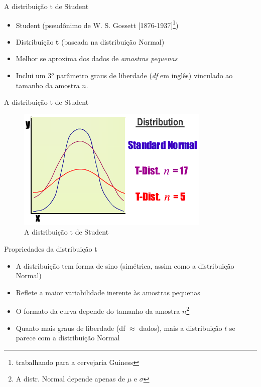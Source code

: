 \documentclass{beamer}
\begin{document}
\begin{frame}{A distribuição t de Student}
  \begin{itemize}
  \item Student (pseudônimo de W. S. Gossett [1876-1937]\footnote{trabalhando
    para a cervejaria Guiness})
  \item Distribuição {\bf t} ({\footnotesize baseada na distribuição Normal})
  \item Melhor se aproxima dos dados de {\em amostras pequenas}
  \item Inclui um 3$^o$ parâmetro \alert{graus de liberdade} ({\em df} em inglês) {\footnotesize vinculado ao tamanho da amostra $n$}.
  \end{itemize}
\end{frame}

\begin{frame}{A distribuição t de Student}
  \begin{figure}
    \includegraphics[height=0.7\textheight]{Inf_II/t_graph}
    \caption{A distribuição t de Student}
  \end{figure}
\end{frame}

\begin{frame}{Propriedades da distribuição t}
  \begin{itemize}
  \item A distribuição tem forma de sino (simétrica, assim como a
    distribuição Normal)
  \item Reflete a maior variabilidade inerente às amostras pequenas
  \item O formato da curva depende do tamanho da amostra $n$\footnote{A distr. Normal depende apenas de $\mu$ e $\sigma$}
  \item Quanto mais graus de liberdade (df $\approx$ dados), mais a distribuição
    $t$ se parece com a distribuição Normal
  \end{itemize}
\end{frame}
\end{document}
